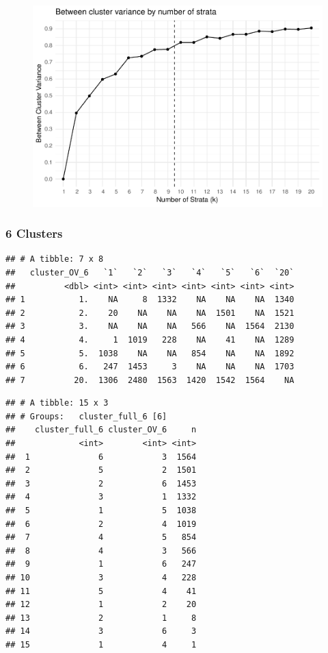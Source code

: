 \documentclass[floatsintext,man]{apa6}
\theoremstyle{definition}
\theoremstyle{definition}
\theoremstyle{definition}
\theoremstyle{remark}
\begin{document}
\begin{figure}
\centering
\includegraphics{Method_files/figure-latex/SUBS_OV_SSB/SST-1.pdf}
\caption{}
\end{figure}

\subsubsection{6 Clusters}\label{clusters}

\begin{verbatim}
## # A tibble: 7 x 8
##   cluster_OV_6   `1`   `2`   `3`   `4`   `5`   `6`  `20`
##          <dbl> <int> <int> <int> <int> <int> <int> <int>
## 1           1.    NA     8  1332    NA    NA    NA  1340
## 2           2.    20    NA    NA    NA  1501    NA  1521
## 3           3.    NA    NA    NA   566    NA  1564  2130
## 4           4.     1  1019   228    NA    41    NA  1289
## 5           5.  1038    NA    NA   854    NA    NA  1892
## 6           6.   247  1453     3    NA    NA    NA  1703
## 7          20.  1306  2480  1563  1420  1542  1564    NA
\end{verbatim}

\begin{verbatim}
## # A tibble: 15 x 3
## # Groups:   cluster_full_6 [6]
##    cluster_full_6 cluster_OV_6     n
##             <int>        <int> <int>
##  1              6            3  1564
##  2              5            2  1501
##  3              2            6  1453
##  4              3            1  1332
##  5              1            5  1038
##  6              2            4  1019
##  7              4            5   854
##  8              4            3   566
##  9              1            6   247
## 10              3            4   228
## 11              5            4    41
## 12              1            2    20
## 13              2            1     8
## 14              3            6     3
## 15              1            4     1
\end{verbatim}
\end{document}
